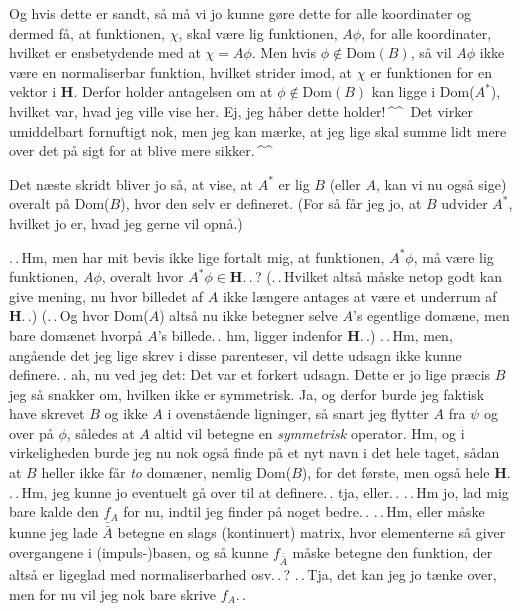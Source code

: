 \documentclass{report}
\begin{document}
Og hvis dette er sandt, så må vi jo kunne gøre dette for alle koordinater og dermed få, at funktionen, $\chi$, skal være lig funktionen, $A\phi$, for alle koordinater, hvilket er ensbetydende med at $\chi= A\phi$. Men hvis $\phi\notin\mathrm{Dom}(B)$, så vil $A\phi$ ikke være en normaliserbar funktion, hvilket strider imod, at $\chi$ er funktionen for en vektor i \textbf{H}. Derfor holder antagelsen om at $\phi\notin\mathrm{Dom}(B)$ kan ligge i Dom($A^*$), hvilket var, hvad jeg ville vise her. Ej, jeg håber dette holder!\,\textasciicircum\textasciicircum\ Det virker umiddelbart fornuftigt nok, men jeg kan mærke, at jeg lige skal summe lidt mere over det på sigt for at blive mere sikker.\,\textasciicircum\textasciicircum

Det næste skridt bliver jo så, at vise, at $A^*$ er lig $B$ (eller $A$, kan vi nu også sige) overalt på Dom($B$), hvor den selv er defineret. (For så får jeg jo, at $B$ udvider $A^*$, hvilket jo er, hvad jeg gerne vil opnå.) 

.\,.\,Hm, men har mit bevis ikke lige fortalt mig, at funktionen, $A^*\phi$, må være lig funktionen, $A\phi$, overalt hvor $A^*\phi \in\mathrm{\textbf{H}}$.\,.\,? (.\,.\,Hvilket altså måske netop godt kan give mening, nu hvor billedet af $A$ ikke længere antages at være et underrum af \textbf{H}.\,.) (.\,.\,Og hvor Dom($A$) altså nu ikke betegner selve $A$'s egentlige domæne, men bare domænet hvorpå $A$'s billede.\,. hm, ligger indenfor \textbf{H}.\,.) .\,.\,Hm, men, angående det jeg lige skrev i disse parenteser, vil dette udsagn ikke kunne definere.\,. ah, nu ved jeg det: Det var et forkert udsagn. Dette er jo lige præcis $B$ jeg så snakker om, hvilken ikke er symmetrisk. Ja, og derfor burde jeg faktisk have skrevet $B$ og ikke $A$ i ovenstående ligninger, så snart jeg flytter $A$ fra $\psi$ og over på $\phi$, således at $A$ altid vil betegne en \emph{symmetrisk} operator. Hm, og i virkeligheden burde jeg nu nok også finde på et nyt navn i det hele taget, sådan at $B$ heller ikke får \emph{to} domæner, nemlig Dom($B$), for det første, men også hele \textbf{H}. .\,.\,Hm, jeg kunne jo eventuelt gå over til at definere.\,. tja, eller.\,.  .\,.\,Hm jo, lad mig bare kalde den $f_A$ for nu, indtil jeg finder på noget bedre.\,. .\,.\,Hm, eller måske kunne jeg lade $\bar{\bar{A}}$ betegne en slags (kontinuert) matrix, hvor elementerne så giver overgangene i (impuls-)basen, og så kunne $f_{\bar{\bar{A}}}$ måske betegne den funktion, der altså er ligeglad med normaliserbarhed osv.\,.\,? .\,.\,Tja, det kan jeg jo tænke over, men for nu vil jeg nok bare skrive $f_A$.\,. 
\end{document}
